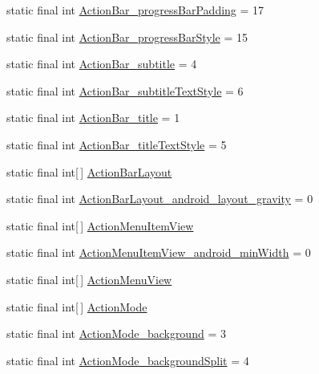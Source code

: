 \begin{CompactItemize}
\item 
static final int \hyperlink{classandroid_1_1support_1_1v4_1_1_r_1_1styleable_86bc83c8961f6605b5d3fa0a1ae7ec1c}{ActionBar\_\-progressBarPadding} = 17
\item 
static final int \hyperlink{classandroid_1_1support_1_1v4_1_1_r_1_1styleable_4d02536c4a498848e9b2a9223f011d73}{ActionBar\_\-progressBarStyle} = 15
\item 
static final int \hyperlink{classandroid_1_1support_1_1v4_1_1_r_1_1styleable_b13c54236519fed1addd3ca8eb816d6d}{ActionBar\_\-subtitle} = 4
\item 
static final int \hyperlink{classandroid_1_1support_1_1v4_1_1_r_1_1styleable_8ebb80bb063e0a82480659b40929e291}{ActionBar\_\-subtitleTextStyle} = 6
\item 
static final int \hyperlink{classandroid_1_1support_1_1v4_1_1_r_1_1styleable_71731b8a49f4eb22e29277c675a98927}{ActionBar\_\-title} = 1
\item 
static final int \hyperlink{classandroid_1_1support_1_1v4_1_1_r_1_1styleable_6a25d0e26442974dff249844cf2955a8}{ActionBar\_\-titleTextStyle} = 5
\item 
static final int\mbox{[}$\,$\mbox{]} \hyperlink{classandroid_1_1support_1_1v4_1_1_r_1_1styleable_af2d29b7fdd4bc3d0c0d77e61105407e}{ActionBarLayout}
\item 
static final int \hyperlink{classandroid_1_1support_1_1v4_1_1_r_1_1styleable_6bc8c975c8164ed43a3d31fcac401931}{ActionBarLayout\_\-android\_\-layout\_\-gravity} = 0
\item 
static final int\mbox{[}$\,$\mbox{]} \hyperlink{classandroid_1_1support_1_1v4_1_1_r_1_1styleable_2f03c9fcd2a52e8fee3ae3171db87b03}{ActionMenuItemView}
\item 
static final int \hyperlink{classandroid_1_1support_1_1v4_1_1_r_1_1styleable_ffcde03d222aaaad9bf2139f8e587b0e}{ActionMenuItemView\_\-android\_\-minWidth} = 0
\item 
static final int\mbox{[}$\,$\mbox{]} \hyperlink{classandroid_1_1support_1_1v4_1_1_r_1_1styleable_d3b42510407946124b468ccdcb585ed8}{ActionMenuView}
\item 
static final int\mbox{[}$\,$\mbox{]} \hyperlink{classandroid_1_1support_1_1v4_1_1_r_1_1styleable_cb0fd98eb07ef010055f95821e8da84e}{ActionMode}
\item 
static final int \hyperlink{classandroid_1_1support_1_1v4_1_1_r_1_1styleable_a9a053b1676fbd1bb2b4db3234f7a47b}{ActionMode\_\-background} = 3
\item 
static final int \hyperlink{classandroid_1_1support_1_1v4_1_1_r_1_1styleable_8c52d714dfc0ee49d394e2c5f6d4d83c}{ActionMode\_\-backgroundSplit} = 4

\end{CompactItemize}
